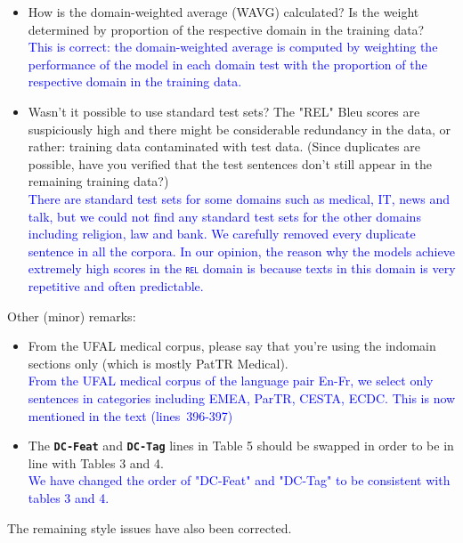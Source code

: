 \documentclass[12pt,times,a4paper,twoside]{article}
\newcommand{\fyTodo}[1]{\Todo[FY:]{\textcolor{orange}{#1}}}
\theoremstyle{definition}
\newcommand{\domain}[1]{\texttt{\textsc{#1}}}
\newcommand{\system}[1]{\texttt{\textbf{#1}}}
\begin{document}
\begin{itemize}
\\
\item How is the domain-weighted average (WAVG) calculated? Is the weight determined by proportion of the respective domain in the training data?
\\
\textcolor{blue}{This is correct: the domain-weighted average is computed by weighting the performance of the model in each domain test with the proportion of the respective domain in the training data.}
\\
\item Wasn't it possible to use standard test sets? The "REL" Bleu scores are suspiciously high and there might be considerable redundancy in the data, or rather: training data contaminated with test data. (Since duplicates are possible, have you verified that the test sentences don't still appear in the remaining training data?)
\\
\textcolor{blue}{There are standard test sets for some domains such as medical, IT, news and talk, but we could not find any standard test sets for the other domains including religion, law and bank. We carefully removed every duplicate sentence in all the corpora. In our opinion, the reason why the models achieve extremely high scores in the \domain{rel} domain is because texts in this domain is very repetitive and often predictable.}\fyTodo{sentence length ?, diversity index of vocab ?}
\end{itemize}

Other (minor) remarks:

\begin{itemize}
\item From the UFAL medical corpus, please say that you're using the indomain sections only (which is mostly PatTR Medical).
\\
\textcolor{blue}{From the UFAL medical corpus of the language pair En-Fr, we select only sentences in categories including EMEA, ParTR, CESTA, ECDC. This is now mentioned in the text (lines~396-397)}\fyTodo{Add lines num}
\\
\item The \system{DC-Feat} and \system{DC-Tag} lines in Table 5 should be swapped in order to be in line with Tables 3 and 4.
  \\
  \textcolor{blue}{We have changed the order of "DC-Feat" and "DC-Tag" to be consistent with tables 3 and 4.}
\end{itemize}

The remaining style issues have also been corrected.



\end{document}
